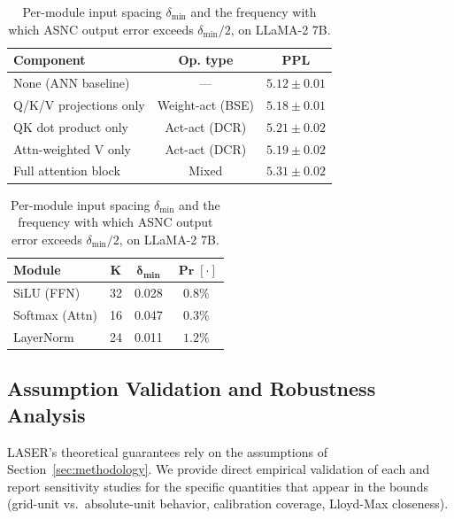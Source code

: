 \documentclass{article}
\theoremstyle{plain}
\theoremstyle{definition}
\theoremstyle{remark}
\begin{document}
\begin{table}[h!]
\begin{minipage}[t]{0.54\textwidth}
\centering
\footnotesize
\setlength{\tabcolsep}{3pt}
\caption{Attention component ablation, LLaMA-2 7B, WikiText-2
(FP16, 16 steps).}
\label{tab:attention_ablation}
\begin{tabular}{lcc}
\toprule
\textbf{Component} & \textbf{Op. type} & \textbf{PPL} \\
\midrule
None (ANN baseline)        & ---             & $5.12 \pm 0.01$ \\
Q/K/V projections only     & Weight-act (BSE) & $5.18 \pm 0.01$ \\
QK dot product only        & Act-act (DCR)    & $5.21 \pm 0.02$ \\
Attn-weighted V only       & Act-act (DCR)    & $5.19 \pm 0.02$ \\
Full attention block       & Mixed            & $5.31 \pm 0.02$ \\
\bottomrule
\end{tabular}
\end{minipage}\hfill
\begin{minipage}[t]{0.44\textwidth}
\centering
\footnotesize
\setlength{\tabcolsep}{3pt}
\caption{Per-module input spacing $\delta_{\min}$ and the frequency with
which ASNC output error exceeds $\delta_{\min}/2$, on LLaMA-2 7B.}
\label{tab:delta_min}
\begin{tabular}{lccc}
\toprule
\textbf{Module} & $\boldsymbol{K}$ & $\boldsymbol{\delta_{\min}}$ & $\boldsymbol{\Pr[\cdot]}$ \\
\midrule
SiLU (FFN)     & 32 & 0.028 & $0.8\%$ \\
Softmax (Attn) & 16 & 0.047 & $0.3\%$ \\
LayerNorm      & 24 & 0.011 & $1.2\%$ \\
\bottomrule
\end{tabular}
\end{minipage}
\end{table}

\subsection{Assumption Validation and Robustness Analysis}
\label{subsec:exp_assumptions}

LASER's theoretical guarantees rely on the assumptions of
Section~\ref{sec:methodology}. We provide direct empirical validation of each
and report sensitivity studies for the specific quantities that appear in the
bounds (grid-unit vs.\ absolute-unit behavior, calibration coverage,
Lloyd-Max closeness).
\end{document}
